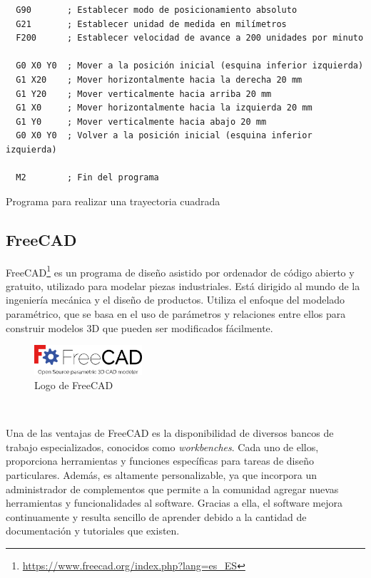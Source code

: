 \begin{code}[h]
\begin{verbatim}
  G90       ; Establecer modo de posicionamiento absoluto
  G21       ; Establecer unidad de medida en milímetros
  F200      ; Establecer velocidad de avance a 200 unidades por minuto 
  
  G0 X0 Y0  ; Mover a la posición inicial (esquina inferior izquierda) 
  G1 X20    ; Mover horizontalmente hacia la derecha 20 mm
  G1 Y20    ; Mover verticalmente hacia arriba 20 mm
  G1 X0     ; Mover horizontalmente hacia la izquierda 20 mm
  G1 Y0     ; Mover verticalmente hacia abajo 20 mm
  G0 X0 Y0  ; Volver a la posición inicial (esquina inferior izquierda)
  
  M2        ; Fin del programa
\end{verbatim}
\caption{Programa para realizar una trayectoria cuadrada}
\label{cod:ejemplo_gcode}
\end{code}
\newpage
\subsection{FreeCAD}
\label{subsec:freecad}
\noindent FreeCAD\footnote{\url{https://www.freecad.org/index.php?lang=es_ES}} es un programa de diseño asistido por ordenador de código abierto y gratuito, 
utilizado para modelar piezas industriales.
Está dirigido al mundo de la ingeniería mecánica y el diseño de productos. Utiliza el enfoque del modelado paramétrico, que se basa 
en el uso de parámetros y relaciones entre ellos para construir modelos 3D que pueden ser 
modificados fácilmente. 

\begin{figure} [h!]
  \begin{center}
    \includegraphics[width=4cm]{figs/freecad.png}
  \end{center}
  \caption{Logo de FreeCAD}
  \label{fig:freecadlogo}
\end{figure}\ 


Una de las ventajas de FreeCAD es la disponibilidad de diversos bancos de trabajo especializados, 
conocidos como \textit{workbenches}. Cada uno de ellos, proporciona herramientas y funciones 
específicas para tareas de diseño particulares. Además, es altamente personalizable, ya que incorpora un administrador de complementos que permite a la comunidad 
agregar nuevas herramientas y funcionalidades al software. Gracias a ella, el software mejora continuamente y 
resulta sencillo de aprender debido a la cantidad de documentación y tutoriales que existen.
\newpage
